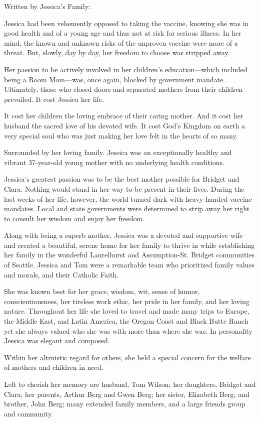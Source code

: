 Written by Jessica’s Family:

Jessica had been vehemently opposed to taking the vaccine, knowing she was in
good health and of a young age and thus not at risk for serious illness. In her
mind, the known and unknown risks of the unproven vaccine were more of a
threat. But, slowly, day by day, her freedom to choose was stripped away.

Her passion to be actively involved in her children’s education—which included
being a Room Mom—was, once again, blocked by government mandate. Ultimately,
those who closed doors and separated mothers from their children prevailed. It
cost Jessica her life.

It cost her children the loving embrace of their caring mother. And it cost her
husband the sacred love of his devoted wife. It cost God’s Kingdom on earth a
very special soul who was just making her love felt in the hearts of so many.

Surrounded by her loving family. Jessica was an exceptionally healthy and
vibrant 37-year-old young mother with no underlying health conditions.

Jessica’s greatest passion was to be the best mother possible for Bridget and
Clara. Nothing would stand in her way to be present in their lives. During the
last weeks of her life, however, the world turned dark with heavy-handed vaccine
mandates. Local and state governments were determined to strip away her right to
consult her wisdom and enjoy her freedom.

Along with being a superb mother, Jessica was a devoted and supportive wife and
created a beautiful, serene home for her family to thrive in while establishing
her family in the wonderful Laurelhurst and Assumption-St. Bridget communities
of Seattle. Jessica and Tom were a remarkable team who prioritized family values
and morals, and their Catholic Faith.

She was known best for her grace, wisdom, wit, sense of humor,
conscientiousness, her tireless work ethic, her pride in her family, and her
loving nature. Throughout her life she loved to travel and made many trips to
Europe, the Middle East, and Latin America, the Oregon Coast and Black Butte
Ranch yet she always valued who she was with more than where she was. In
personality Jessica was elegant and composed.

Within her altruistic regard for others, she held a special concern for the
welfare of mothers and children in need.

Left to cherish her memory are husband, Tom Wilson; her daughters, Bridget and
Clara; her parents, Arthur Berg and Gwen Berg; her sister, Elizabeth Berg; and
brother, John Berg; many extended family members, and a large friends group and
community.


